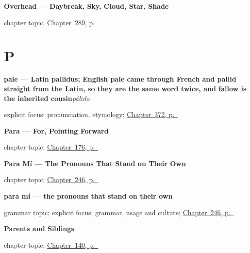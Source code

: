 \noindent\begin{minipage}[t]{\linewidth}
\raggedright
\textbf{Overhead --- Daybreak, Sky, Cloud, Star, Shade}\par
\footnotesize chapter topic; \hyperref[ch:lo-de-arriba]{Chapter~289, p.~\pageref*{ch:lo-de-arriba}}
\end{minipage}\par\smallskip

\section*{P}

\noindent\begin{minipage}[t]{\linewidth}
\raggedright
\textbf{pale — Latin pallidus; English pale came through French and pallid straight from the Latin, so they are the same word twice, and fallow is the inherited cousin}\enspace\emph{pálido}\par
\footnotesize explicit focus: pronunciation, etymology; \hyperref[ch:gris-y-rosa]{Chapter~372, p.~\pageref*{ch:gris-y-rosa}}
\end{minipage}\par\smallskip

\noindent\begin{minipage}[t]{\linewidth}
\raggedright
\textbf{Para --- For, Pointing Forward}\par
\footnotesize chapter topic; \hyperref[ch:para]{Chapter~176, p.~\pageref*{ch:para}}
\end{minipage}\par\smallskip

\noindent\begin{minipage}[t]{\linewidth}
\raggedright
\textbf{Para Mí --- The Pronouns That Stand on Their Own}\par
\footnotesize chapter topic; \hyperref[ch:para-mi]{Chapter~246, p.~\pageref*{ch:para-mi}}
\end{minipage}\par\smallskip

\noindent\begin{minipage}[t]{\linewidth}
\raggedright
\textbf{para mí — the pronouns that stand on their own}\par
\footnotesize grammar topic; explicit focus: grammar, usage and culture; \hyperref[ch:para-mi]{Chapter~246, p.~\pageref*{ch:para-mi}}
\end{minipage}\par\smallskip

\noindent\begin{minipage}[t]{\linewidth}
\raggedright
\textbf{Parents and Siblings}\par
\footnotesize chapter topic; \hyperref[ch:spanish-family]{Chapter~140, p.~\pageref*{ch:spanish-family}}
\end{minipage}\par\smallskip

